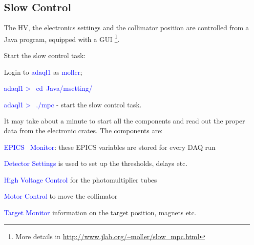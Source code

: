 {\subsection {Slow Control}
\label{sec:moller_compon_slow}

The HV, the electronics settings and the collimator position
are controlled from a Java program, equipped with a GUI%
\footnote{More details in \url{http://www.jlab.org/~moller/slow_mpc.html}}.

 Start the slow control task:
 \begin{list}{--}{\setlength{\itemsep}{-0.15cm}}
   \item Login to \textcolor{blue}{adaql1} as \textcolor{blue}{moller};
   \item \textcolor{blue}{adaql1$>$~cd~Java/msetting/}
   \item \textcolor{blue}{adaql1$>$~./mpc} - start the slow control task.
 \end{list}
 It may take about a minute to start all the components and read out
 the proper data from the electronic crates.
 The components are: 
 \begin{list}{--}{\setlength{\itemsep}{-0.15cm}}
   \item \textcolor{blue}{EPICS~\cite{EPICSwww} Monitor}: these EPICS variables are stored for every DAQ run
   \item \textcolor{blue}{Detector Settings} is used to set up the thresholds, delays etc.
   \item \textcolor{blue}{High Voltage Control} for the photomultiplier tubes
   \item \textcolor{blue}{Motor Control} to move the collimator
   \item \textcolor{blue}{Target Monitor} information on the target position, magnets etc.
 \end{list}
\infolevtwo{

}}
